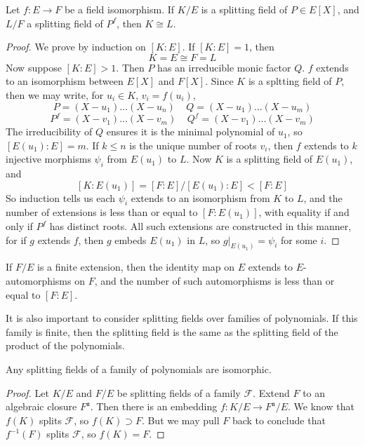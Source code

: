 \begin{theorem}
    Let $f: E \to F$ be a field isomorphism. If $K/E$ is a splitting field of $P \in E[X]$, and $L/F$ a splitting field of $P^f$, then $K \cong L$.
\end{theorem}
\begin{proof}
    We prove by induction on $[K:E]$. If $[K:E] = 1$, then
    \[ K = E \cong F = L \]
    Now suppose $[K:E] > 1$. Then $P$ has an irreducible monic factor $Q$. $f$ extends to an isomorphism between $E[X]$ and $F[X]$. Since $K$ is a spltting field of $P$, then we may write, for $u_i \in K$, $v_i = f(u_i)$,
    \[ P = (X - u_1) \dots (X - u_n)\ \ \ \ \ Q = (X - u_1) \dots (X - u_m) \]
    \[ P^f = (X - v_1) \dots (X - v_m)\ \ \ \ \ Q^f = (X - v_1) \dots (X - v_m) \]
    The irreducibility of $Q$ ensures it is the minimal polynomial of $u_1$, so $[E(u_1): E] = m$. If $k \leq n$ is the unique number of roots $v_i$, then $f$ extends to $k$ injective morphisms $\psi_i$ from $E(u_1)$ to $L$. Now $K$ is a splitting field of $E(u_1)$, and
    \[ [K:E(u_1)] = [F:E]/[E(u_1):E] < [F:E] \]
    So induction tells us each $\psi_i$ extends to an isomorphism from $K$ to $L$, and the number of extensions is less than or equal to $[F:E(u_1)]$, with equality if and only if $P^f$ has distinct roots. All such extensions are constructed in this manner, for if $g$ extends $f$, then $g$ embeds $E(u_1)$ in $L$, so $g|_{E(u_1)} = \psi_i$ for some $i$.
\end{proof}

\begin{corollary}
    If $F/E$ is a finite extension, then the identity map on $E$ extends to $E$-automorphisms on $F$, and the number of such automorphisms is less than or equal to $[F:E]$.
\end{corollary}

It is also important to consider splitting fields over families of polynomials. If this family is finite, then the splitting field is the same as the splitting field of the product of the polynomials.

\begin{theorem}
    Any splitting fields of a family of polynomials are isomorphic.
\end{theorem}
\begin{proof}
    Let $K/E$ and $F/E$ be splitting fields of a family $\mathcal{F}$. Extend $F$ to an algebraic closure $F^{\mathfrak{a}}$. Then there is an embedding $f:K/E \to F^{\mathfrak{a}}/E$. We know that $f(K)$ splits $\mathcal{F}$, so $f(K) \supset F$. But we may pull $F$ back to conclude that $f^{-1}(F)$ splits $\mathcal{F}$, so $f(K) = F$.
\end{proof}


